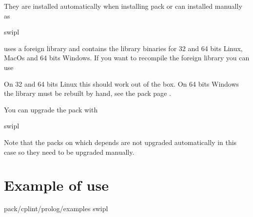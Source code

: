 \documentclass[letterpaper,10pt,english]{sphinxmanual}
\begin{document}
\sphinxAtStartPar
They are installed automatically when installing pack  or can installed manually as

\begin{sphinxVerbatim}[commandchars=\\\{\}]
swipl
\end{sphinxVerbatim}

\sphinxAtStartPar
{} uses a foreign library and contains the library binaries for 32 and 64 bits Linux, MacOs and 64 bits Windows. If you want to recompile the foreign library you can use

\begin{sphinxVerbatim}[commandchars=\\\{\}]
 
\end{sphinxVerbatim}

\sphinxAtStartPar
On 32 and 64 bits Linux this should work out of the box. On 64 bits Windows the library must be rebuilt by hand, see the pack page .

\sphinxAtStartPar
You can upgrade the pack with

\begin{sphinxVerbatim}[commandchars=\\\{\}]
swipl
\end{sphinxVerbatim}

\sphinxAtStartPar
Note that the packs on which  depends are not upgraded automatically in this case so they need to be upgraded manually.


\section{Example of use}
\label{\detokenize{index:example-of-use}}
\begin{sphinxVerbatim}[commandchars=\\\{\}]
 \PYGZlt{}pack\PYGZgt{}/cplint/prolog/examples
swipl
\end{sphinxVerbatim}
\end{document}
